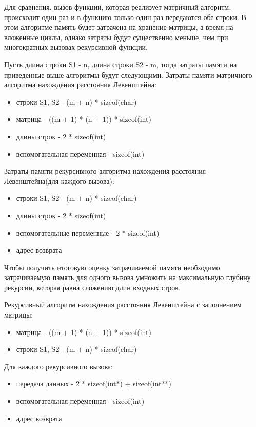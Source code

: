 \documentclass[12pt]{report}
\begin{document}
Для сравнения, вызов функции, которая реализует матричный алгоритм, происходит один раз и в функцию только один раз передаются обе строки. В этом алгоритме память будет затрачена на хранение матрицы, а время на вложенные циклы, однако затраты будут существенно меньше, чем при многократных вызовах рекурсивной функции.

Пусть длина строки S1 - n, длина строки S2 - m, тогда затраты памяти на приведенные выше алгоритмы будут следующими.
Затраты памяти матричного алгоритма нахождения расстояния Левенштейна:\begin{itemize}
	\item строки S1, S2 - (m + n) * sizeof(char)
	\item матрица - ((m + 1) * (n + 1)) * sizeof(int)
	\item длины строк - 2 * sizeof(int)
	\item вспомогательная переменная - sizeof(int)
\end{itemize}
Затраты памяти рекурсивного алгоритма нахождения расстояния Левенштейна(для каждого вызова):\begin{itemize}
	\item строки S1, S2 - (m + n) * sizeof(char)
	\item длины строк - 2 * sizeof(int)
	\item вспомогательные переменные -  2 * sizeof(int)
	\item адрес возврата
\end{itemize}
 
 Чтобы получить итоговую оценку затрачиваемой памяти необходимо затрачиваемую память для одного вызова умножить на максимальную глубину рекурсии, которая равна сложению длин входных строк.\vspace{\baselineskip}
 
 
 Рекурсивный алгоритм нахождения расстояния Левенштейна с заполнением матрицы:
 \begin{itemize}
	\item матрица - ((m + 1) * (n + 1)) * sizeof(int) 
	\item строки S1, S2 - (m + n) * sizeof(char)
\end{itemize}
 
 Для каждого рекурсивного вызова:
\begin{itemize}
	\item передача данных - 2 * sizeof(int*) + sizeof(int**)
	\item вспомогательная переменная -  sizeof(int)
	\item адрес возврата
\end{itemize}
 
\end{document}
